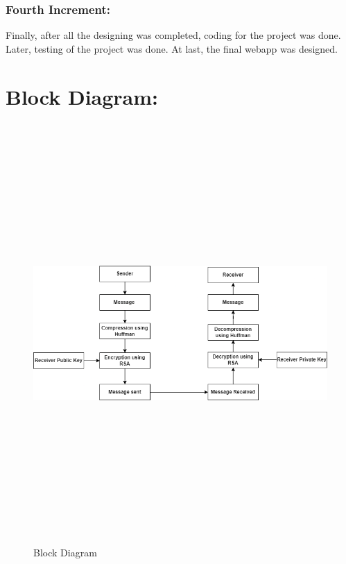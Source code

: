 \subsubsection{Fourth Increment:}
Finally, after all the designing was completed, coding for the project was done. Later,
testing of the project was done.
At last, the final webapp was designed.
\pagebreak

\section{Block Diagram:}
\begin{figure}[H]
	\centering
	\includegraphics[width=170mm, height=160mm]{images/Block Diagram.png}
	\caption{Block Diagram} %
	\label{figblockdiagram} %
\end{figure}


